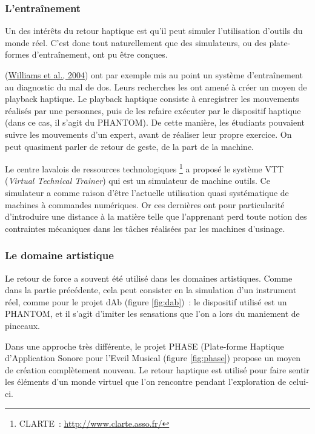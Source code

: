 \documentclass[
]{book}
\begin{document}
\hypertarget{lentrauxeenement}{%
\subsubsection{L'entraînement}\label{lentrauxeenement}}

Un des intérêts du retour haptique est qu'il peut simuler l'utilisation
d'outils du monde réel. C'est donc tout naturellement que des simulateurs, ou
des plate-formes d'entraînement, ont pu être conçues.

(\protect\hyperlink{ref-williams2004implementation}{Williams et al., 2004}) ont par
exemple mis au point un système d'entraînement au diagnostic du mal de dos.
Leurs recherches les ont amené à créer un moyen de playback haptique. Le
playback haptique consiste à enregistrer les mouvements réalisés par une
personnes, puis de les refaire exécuter par le dispositif haptique (dans ce
cas, il s'agit du PHANTOM). De cette manière, les étudiants pouvaient suivre
les mouvements d'un expert, avant de réaliser leur propre exercice. On peut
quasiment parler de retour de geste, de la part de la machine.

Le centre lavalois de ressources
technologiques \footnote{CLARTE~: \url{http://www.clarte.asso.fr/}} a proposé le système VTT
(\emph{Virtual Technical Trainer}) qui est un simulateur de machine outils.
Ce simulateur a comme raison d'être l'actuelle utilisation quasi systématique
de machines à commandes numériques. Or ces dernières ont pour particularité
d'introduire une distance à la matière telle que l'apprenant perd toute
notion des contraintes mécaniques dans les tâches réalisées par les machines
d'usinage.

\hypertarget{le-domaine-artistique}{%
\subsubsection{Le domaine artistique}\label{le-domaine-artistique}}

Le retour de force a souvent été utilisé dans les domaines artistiques.
Comme dans la partie précédente, cela peut consister en la simulation d'un
instrument réel, comme pour le projet dAb (figure \ref{fig:dab})~:
le dispositif utilisé est un PHANTOM, et il s'agit d'imiter les sensations
que l'on a lors du maniement de pinceaux.

Dans une approche très différente, le projet PHASE (Plate-forme Haptique
d'Application Sonore pour l'Eveil Musical (figure \ref{fig:phase})
propose un moyen de création complètement nouveau. Le retour haptique est
utilisé pour faire sentir les éléments d'un monde virtuel que l'on rencontre
pendant l'exploration de celui-ci.
\end{document}
